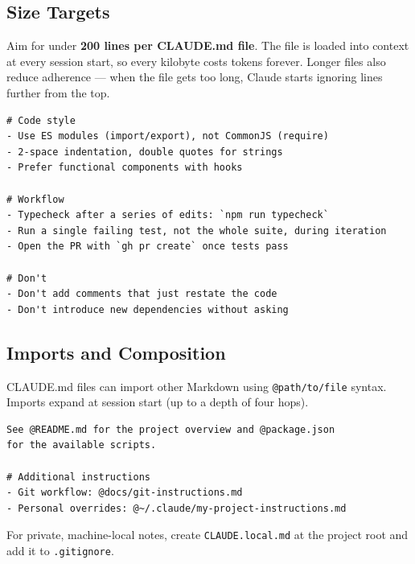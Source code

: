 \subsection{Size Targets}

Aim for under \textbf{200 lines per CLAUDE.md file}. The file is loaded into
context at every session start, so every kilobyte costs tokens forever.
Longer files also reduce adherence — when the file gets too long, Claude
starts ignoring lines further from the top.

\begin{lstlisting}[caption={A focused CLAUDE.md (\textasciitilde 30 lines)}]
# Code style
- Use ES modules (import/export), not CommonJS (require)
- 2-space indentation, double quotes for strings
- Prefer functional components with hooks

# Workflow
- Typecheck after a series of edits: `npm run typecheck`
- Run a single failing test, not the whole suite, during iteration
- Open the PR with `gh pr create` once tests pass

# Don't
- Don't add comments that just restate the code
- Don't introduce new dependencies without asking
\end{lstlisting}

\subsection{Imports and Composition}


CLAUDE.md files can import other Markdown using \texttt{@path/to/file}
syntax. Imports expand at session start (up to a depth of four hops).

\begin{lstlisting}[caption={Importing related files into CLAUDE.md}]
See @README.md for the project overview and @package.json
for the available scripts.

# Additional instructions
- Git workflow: @docs/git-instructions.md
- Personal overrides: @~/.claude/my-project-instructions.md
\end{lstlisting}

For private, machine-local notes, create \texttt{CLAUDE.local.md} at the
project root and add it to \texttt{.gitignore}.

